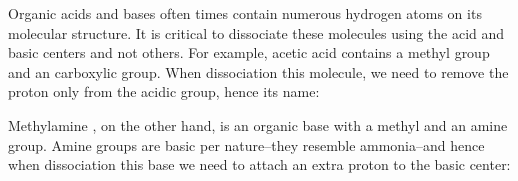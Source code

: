\documentclass[main.tex]{subfiles}
\begin{document}
\begin{description}
\begin{example}
\end{example}%
\item[\docfilehook{\smallpencil Dissociating organic acids and bases}{Dissociating organic acids and bases}] 
Organic acids and bases often times contain numerous hydrogen atoms on its molecular structure. It is critical to dissociate these molecules using the acid and basic centers and not others. For example, acetic acid  contains a methyl group and an carboxylic group. When dissociation this molecule, we need to remove the proton only from the acidic group, hence its name:
\begin{center}\end{center}
Methylamine , on the other hand, is an organic base with a methyl and an amine group. Amine groups are basic per nature--they resemble ammonia--and hence when dissociation this base we need to attach an extra proton to the basic center:
\begin{center}\end{center}





\end{description}
\end{document}
